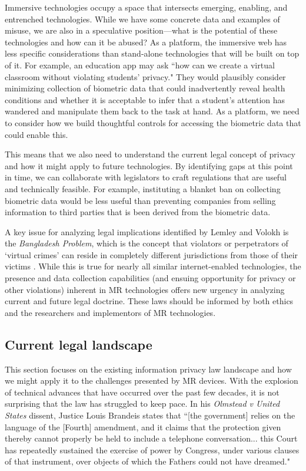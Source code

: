 Immersive technologies occupy a space that intersects emerging, enabling, and entrenched technologies. While we have some concrete data and examples of misuse, we are also in a speculative position---what is the potential of these technologies and how can it be abused? As a platform, the immersive web has less specific considerations than stand-alone technologies that will be built on top of it. For example, an education app may ask ``how can we create a virtual classroom without violating students' privacy." They would plausibly consider minimizing collection of biometric data that could inadvertently reveal health conditions and whether it is acceptable to infer that a student's attention has wandered and manipulate them back to the task at hand. As a platform, we need to consider how we build thoughtful controls for accessing the biometric data that could enable this.

This means that we also need to understand the current legal concept of privacy and how it might apply to future technologies. By identifying gaps at this point in time, we can collaborate with legislators to craft regulations that are useful and technically feasible. For example, instituting a blanket ban on collecting biometric data would be less useful than preventing companies from selling information to third parties that is been derived from the biometric data.

A key issue for analyzing legal implications identified by Lemley and Volokh is the \emph{Bangladesh Problem}, which is the concept that violators or perpetrators of `virtual crimes' can reside in completely different jurisdictions from those of their victims \cite{lemley2017law}. While this is true for nearly all similar internet-enabled technologies, the presence and data collection capabilities (and ensuing opportunity for privacy or other violations) inherent in MR technologies offers new urgency in analyzing current and future legal doctrine. These laws should be informed by both ethics and the researchers and implementors of MR technologies.

\subsection{Current legal landscape}\label{sec:laws}

This section focuses on the existing information privacy law landscape and how we might apply it to the challenges presented by MR devices. With the explosion of technical advances that have occurred over the past few decades, it is not surprising that the law has struggled to keep pace. In his \emph{Olmstead v United States} dissent, Justice Louis Brandeis states that ``[the government] relies on the language of the [Fourth] amendment, and it claims that the protection given thereby cannot properly be held to include a telephone conversation... this Court has repeatedly sustained the exercise of power by Congress, under various clauses of that instrument, over objects of which the Fathers could not have dreamed."


